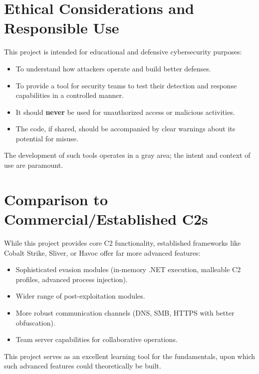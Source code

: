 \section{Ethical Considerations and Responsible Use}
This project is intended for educational and defensive cybersecurity purposes:
\begin{itemize}
    \item To understand how attackers operate and build better defenses.
    \item To provide a tool for security teams to test their detection and response capabilities in a controlled manner.
    \item It should \textbf{never} be used for unauthorized access or malicious activities.
    \item The code, if shared, should be accompanied by clear warnings about its potential for misuse.
\end{itemize}
The development of such tools operates in a gray area; the intent and context of use are paramount.

\section{Comparison to Commercial/Established C2s}
While this project provides core C2 functionality, established frameworks like Cobalt Strike, Sliver, or Havoc offer far more advanced features:
\begin{itemize}
    \item Sophisticated evasion modules (in-memory .NET execution, malleable C2 profiles, advanced process injection).
    \item Wider range of post-exploitation modules.
    \item More robust communication channels (DNS, SMB, HTTPS with better obfuscation).
    \item Team server capabilities for collaborative operations.
\end{itemize}
This project serves as an excellent learning tool for the fundamentals, upon which such advanced features could theoretically be built.